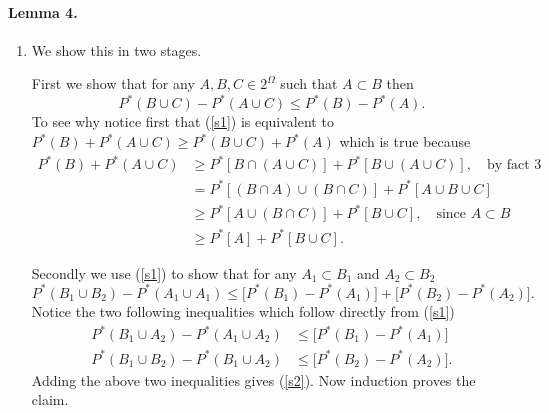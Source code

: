 \documentclass[10pt,letterpaper]{article}
\begin{document}
\paragraph{Lemma 4.}
\begin{enumerate}
\item We show this in two stages. 

First we show that for any $A, B, C\in 2^\Omega$ such that $A\subset B$ then 
\begin{equation}
\label{s1}
P^*(B\cup C)- P^*(A\cup C) \leq P^*(B)-P^*(A).
\end{equation}
To see why notice first that (\ref{s1}) is equivalent to $ P^*(B)+ P^*(A\cup C)\geq P^*(B\cup C)+P^*(A) $ which is true because 
\begin{align*}
P^*(B)+ P^*(A\cup C)&\geq P^*[B\cap (A\cup C)] + P^*[B\cup (A\cup C)], \quad\text{by fact 3}\\
&= P^*[(B\cap A)\cup (B\cap C)] + P^*[A\cup B\cup C] \\
&\geq P^*[A\cup (B\cap C)] + P^*[B\cup C],\quad\text{since $A\subset B$} \\
&\geq P^*[A] + P^*[B\cup C].
\end{align*}


Secondly we use (\ref{s1}) to show that for any $A_1\subset B_1$ and $A_2\subset B_2$
\begin{equation}
\label{s2}
P^*(B_1\cup B_2)- P^*(A_1\cup A_1)\leq  \bigl[ P^*(B_1) -  P^*(A_1)\bigr] +  \bigl[ P^*(B_2) -  P^*(A_2)\bigr].
\end{equation}
Notice the two following inequalities which follow directly from (\ref{s1})
\begin{align*}
P^*(B_1\cup A_2) - P^*(A_1\cup A_2)&\leq \bigl[P^*(B_1) - P^*(A_1)\bigr]\\
P^*(B_1\cup B_2) - P^*(B_1\cup A_2)&\leq \bigl[P^*(B_2) - P^*(A_2)\bigr].
\end{align*}
Adding the above two inequalities gives (\ref{s2}). Now induction proves the claim.


\end{enumerate}
\end{document}
